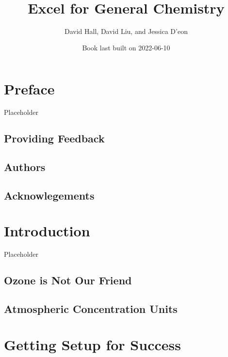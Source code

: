 \documentclass[
]{book}
\title{Excel for General Chemistry}
\author{David Hall, David Liu, and Jessica D'eon}
\date{Book last built on 2022-06-10}
\begin{document}
\maketitle

{
\setcounter{tocdepth}{1}
\tableofcontents
}
\hypertarget{preface}{%
\chapter*{Preface}\label{preface}}

Placeholder

\hypertarget{providing-feedback}{%
\section*{Providing Feedback}\label{providing-feedback}}

\hypertarget{authors}{%
\section*{Authors}\label{authors}}

\hypertarget{acknowlegements}{%
\section*{Acknowlegements}\label{acknowlegements}}

\hypertarget{intro}{%
\chapter{Introduction}\label{intro}}

Placeholder

\hypertarget{ozone-is-not-our-friend}{%
\section{Ozone is Not Our Friend}\label{ozone-is-not-our-friend}}

\hypertarget{atmospheric-concentration-units}{%
\section{Atmospheric Concentration Units}\label{atmospheric-concentration-units}}

\hypertarget{capabilities}{%
\chapter{Getting Setup for Success}\label{capabilities}}
\end{document}
